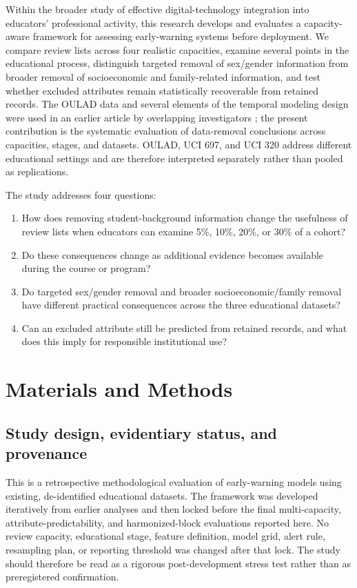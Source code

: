 \documentclass[education,article,submit,moreauthors]{Definitions/mdpi}
\begin{document}
Within the broader study of effective digital-technology integration into educators' professional activity, this research develops and evaluates a capacity-aware framework for assessing early-warning systems before deployment. We compare review lists across four realistic capacities, examine several points in the educational process, distinguish targeted removal of sex/gender information from broader removal of socioeconomic and family-related information, and test whether excluded attributes remain statistically recoverable from retained records. The OULAD data and several elements of the temporal modeling design were used in an earlier article by overlapping investigators \citep{shaikhanova2025interpretable}; the present contribution is the systematic evaluation of data-removal conclusions across capacities, stages, and datasets. OULAD, UCI 697, and UCI 320 address different educational settings and are therefore interpreted separately rather than pooled as replications.

The study addresses four questions:

\begin{enumerate}[leftmargin=1.8em]
\item How does removing student-background information change the usefulness of review lists when educators can examine 5\%, 10\%, 20\%, or 30\% of a cohort?
\item Do these consequences change as additional evidence becomes available during the course or program?
\item Do targeted sex/gender removal and broader socioeconomic/family removal have different practical consequences across the three educational datasets?
\item Can an excluded attribute still be predicted from retained records, and what does this imply for responsible institutional use?
\end{enumerate}

\section{Materials and Methods}

\subsection{Study design, evidentiary status, and provenance}

This is a retrospective methodological evaluation of early-warning models using existing, de-identified educational datasets. The framework was developed iteratively from earlier analyses and then locked before the final multi-capacity, attribute-predictability, and harmonized-block evaluations reported here. No review capacity, educational stage, feature definition, model grid, alert rule, resampling plan, or reporting threshold was changed after that lock. The study should therefore be read as a rigorous post-development stress test rather than as preregistered confirmation.
\end{document}
